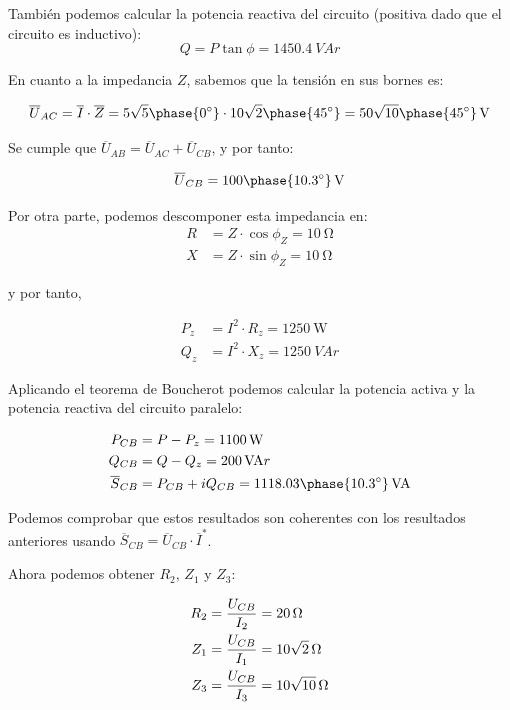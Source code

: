 También podemos calcular la potencia reactiva del circuito
(positiva dado que el circuito es inductivo):
\[
Q = P \tan \phi = \qty{1450.4}{VA}r
\]


En cuanto a la impedancia $Z$, sabemos que la tensión en sus bornes
es:

\[
\overline{U}_{AC} = \overline{I} \cdot \overline{Z} =
5\sqrt{5}\phase{\ang{0}} \cdot 10\sqrt{2}\phase{\ang{45}} = \qty[parse-numbers=false]{50\sqrt{10}\phase{\ang{45}}}{\V}
\]

Se cumple que $\overline{U}_{AB} = \overline{U}_{AC} +
\overline{U}_{CB}$, y por tanto:

\[
\overline{U}_{CB} = \qty[parse-numbers=false]{100\phase{\ang{10.3}}}{\V}
\]

Por otra parte, podemos descomponer esta impedancia en:
\begin{align*}
  R &= Z \cdot \cos \phi_Z = \qty{10}{\ohm}\\
  X &= Z \cdot \sin \phi_Z = \qty{10}{\ohm}
\end{align*}

y por tanto,

\begin{align*}
P_z &= I^2 \cdot R_z = \qty{1250}{\watt}\\
Q_z &= I^2 \cdot X_z = \qty{1250}{VA}r
\end{align*}

Aplicando el teorema de Boucherot podemos calcular la potencia activa
y la potencia reactiva del circuito paralelo:

\begin{align*}
P_{CB} &= P - P_z = \qty{1100}{\watt}\\
Q_{CB} &= Q - Q_z = \qty{200}{VA}r\\
\overline{S}_{CB} &= P_{CB} + i Q_{CB} = \qty[parse-numbers=false]{1118.03\phase{\ang{10.3}}}{VA}
\end{align*}

Podemos comprobar que estos resultados son coherentes con los
resultados anteriores usando $\overline{S}_{CB} = \overline{U}_{CB}
\cdot \overline{I}^*$.


Ahora podemos obtener $R_2$, $Z_1$ y $Z_3$:

\begin{align*}
  R_2 &= \frac{U_{CB}}{I_2} = \qty{20}{\ohm}\\
  Z_1 &= \frac{U_{CB}}{I_1} = \qty[parse-numbers=false]{10\sqrt{2}}{\ohm}\\
  Z_3 &= \frac{U_{CB}}{I_3} = \qty[parse-numbers=false]{10\sqrt{10}}{\ohm}
\end{align*}

